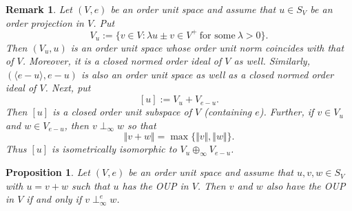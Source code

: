 \documentclass[12pt]{amsart}
\newtheorem{proposition}[theorem]{Proposition}
\newtheorem{remark}[theorem]{Remark}
\begin{document}
\begin{remark}
	Let $(V, e)$ be an order unit space and assume that $u \in S_V$ be an order projection in $V$. Put 
	$$V_u := \lbrace v \in V: \lambda u \pm v \in V^+ ~ \mbox{for some} ~ \lambda > 0 \rbrace.$$ 
	Then $(V_u, u)$ is an order unit space whose order unit norm coincides with that of $V$. Moreover, it is a closed normed order ideal of $V$ as well. Similarly, $(\langle e - u \rangle, e - u)$ is also an order unit space as well as a closed normed order ideal of $V$. Next, put 
	$$[u] := V_u + V_{e - u}.$$ 
	Then $[u]$ is a closed order unit subspace of $V$ (containing $e$). Further, if $v \in V_u$ and $w \in V_{e - u}$, then $v \perp_{\infty}w$ so that 
	$$\Vert v + w \Vert = \max \lbrace \Vert v \Vert, \Vert w \Vert \rbrace.$$ 
	Thus $[u]$ is isometrically isomorphic to $V_u \oplus_{\infty} V_{e - u}$. 
\end{remark} 
\begin{proposition}\label{sum}
	Let $(V, e)$ be an order unit space and assume that $u, v, w \in S_V$ with $u = v + w$ such that $u$ has the OUP in $V$. Then $v$ and $w$ also have the OUP in $V$ if and only if $v \perp_{\infty}^e w$. 
\end{proposition} 
\end{document}
